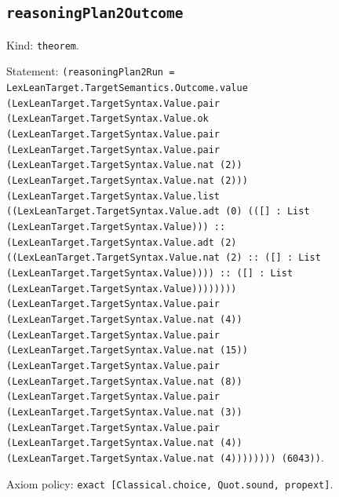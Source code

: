 \documentclass[11pt]{article}
\begin{document}
\subsection*{\texttt{reasoningPlan2Outcome}}
\noindent Kind: \texttt{theorem}.\par
\noindent Statement: \texttt{(reasoningPlan2Run = LexLeanTarget.TargetSemantics.Outcome.value (LexLeanTarget.TargetSyntax.Value.pair (LexLeanTarget.TargetSyntax.Value.ok (LexLeanTarget.TargetSyntax.Value.pair (LexLeanTarget.TargetSyntax.Value.pair (LexLeanTarget.TargetSyntax.Value.nat (2)) (LexLeanTarget.TargetSyntax.Value.nat (2))) (LexLeanTarget.TargetSyntax.Value.list ((LexLeanTarget.TargetSyntax.Value.adt (0) (([] : List (LexLeanTarget.TargetSyntax.Value))) :: (LexLeanTarget.TargetSyntax.Value.adt (2) ((LexLeanTarget.TargetSyntax.Value.nat (2) :: ([] : List (LexLeanTarget.TargetSyntax.Value)))) :: ([] : List (LexLeanTarget.TargetSyntax.Value)))))))) (LexLeanTarget.TargetSyntax.Value.pair (LexLeanTarget.TargetSyntax.Value.nat (4)) (LexLeanTarget.TargetSyntax.Value.pair (LexLeanTarget.TargetSyntax.Value.nat (15)) (LexLeanTarget.TargetSyntax.Value.pair (LexLeanTarget.TargetSyntax.Value.nat (8)) (LexLeanTarget.TargetSyntax.Value.pair (LexLeanTarget.TargetSyntax.Value.nat (3)) (LexLeanTarget.TargetSyntax.Value.pair (LexLeanTarget.TargetSyntax.Value.nat (4)) (LexLeanTarget.TargetSyntax.Value.nat (4)))))))) (6043))}.\par
\noindent Axiom policy: \texttt{exact [Classical.choice, Quot.sound, propext]}.\par
\end{document}
